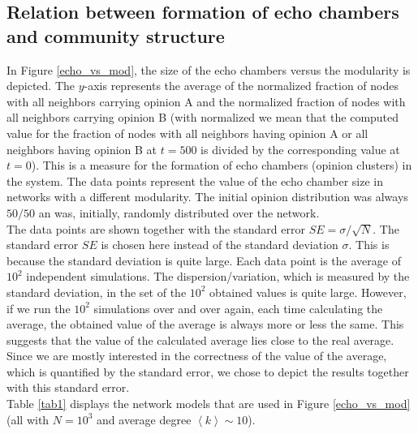 \documentclass[11 pt , letterpaper , twoside , openright]{book}
\begin{document}

\subsection{Relation between formation of echo chambers and community structure}\label{echoVSmod}

In Figure \ref{echo_vs_mod}, the size of the echo chambers versus the modularity is depicted. The $y$-axis represents the average of the normalized fraction of nodes with all neighbors carrying opinion A and the normalized fraction of nodes with all neighbors carrying opinion B (with normalized we mean that the computed value for the fraction of nodes with all neighbors having opinion A or all neighbors having opinion B at $t=500$ is divided by the corresponding value at $t=0$). This is a measure for the formation of echo chambers (opinion clusters) in the system. The data points represent the value of the echo chamber size in networks with a different modularity. The initial opinion distribution was always $50/50$ an was, initially, randomly distributed over the network. \\
\newline
The data points are shown together with the standard error $SE = \sigma /\sqrt{N}$. The standard error $SE$ is chosen here instead of the standard deviation $\sigma$. This is because the standard deviation is quite large. Each data point is the average of $10^2$ independent simulations. The dispersion/variation, which is measured by the standard deviation, in the set of the $10^2$ obtained values is quite large. However, if we run the $10^2$ simulations over and over again, each time calculating the average, the obtained value of the average is always more or less the same. This suggests that the value of the calculated average lies close to the real average. Since we are mostly interested in the correctness of the value of the average, which is quantified by the standard error, we chose to depict the results together with this standard error.\\
\newline
Table \ref{tab1} displays the network models that are used in Figure \ref{echo_vs_mod} (all with $N = 10^3$ and average degree $\left<k\right> \sim 10$).
\end{document}
